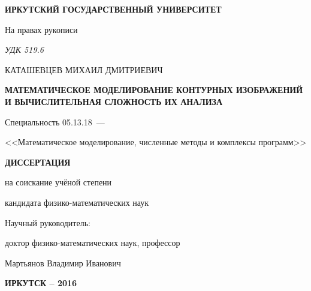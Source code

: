 \thispagestyle{empty}

\begin{center}
\MakeTextUppercase{\bf Иркутский государственный университет}
\par
\end{center}

\vspace{5mm}
\begin{flushright}
На правах рукописи

{\sl УДК 519.6}
\end{flushright}

\vspace{10mm}
\begin{center}
{\large КАТАШЕВЦЕВ МИХАИЛ ДМИТРИЕВИЧ}
\end{center}

\vspace{5mm}
\begin{center}
{\bf \large \MakeTextUppercase{Математическое моделирование контурных изображений и вычислительная сложность их анализа}
\par}

\vspace{10mm}
{%
Специальность 05.13.18~---

<<Математическое моделирование, численные методы и комплексы программ>>
}

\vspace{10mm}
\textbf{\MakeTextUppercase{Диссертация}}

на соискание учёной степени

кандидата физико-математических наук
\end{center}

\vspace{20mm}
\begin{flushright}
Научный руководитель:

доктор физико-математических наук, профессор

Мартьянов Владимир Иванович

\end{flushright}

\vspace{20mm}
\begin{center}
\textbf{\MakeTextUppercase{Иркутск -- 2016}}
\end{center}

\newpage